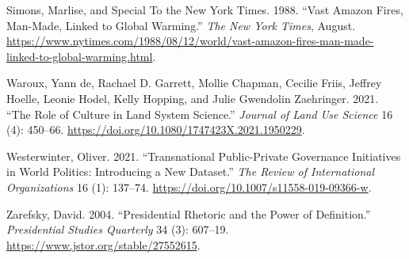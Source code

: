 \documentclass[
]{article}
\newlength{\cslhangindent}
\newlength{\cslentryspacingunit} %
\newenvironment{CSLReferences}[2] %
 {%
  \setlength{\parindent}{0pt}
  \ifodd #1
  \let\oldpar\par
  \def\par{\hangindent=\cslhangindent\oldpar}
  \fi
  \setlength{\parskip}{#2\cslentryspacingunit}
 }%
 {}
\begin{document}
\begin{CSLReferences}{1}{0}
\leavevmode{}%
Simons, Marlise, and Special To the New York Times. 1988. {``Vast Amazon
Fires, Man-Made, Linked to Global Warming.''} \emph{The New York Times},
August.
\url{https://www.nytimes.com/1988/08/12/world/vast-amazon-fires-man-made-linked-to-global-warming.html}.

\leavevmode{}%
Waroux, Yann de, Rachael D. Garrett, Mollie Chapman, Cecilie Friis,
Jeffrey Hoelle, Leonie Hodel, Kelly Hopping, and Julie Gwendolin
Zaehringer. 2021. {``The Role of Culture in Land System Science.''}
\emph{Journal of Land Use Science} 16 (4): 450--66.
\url{https://doi.org/10.1080/1747423X.2021.1950229}.

\leavevmode{}%
Westerwinter, Oliver. 2021. {``Transnational Public-Private Governance
Initiatives in World Politics: Introducing a New Dataset.''} \emph{The
Review of International Organizations} 16 (1): 137--74.
\url{https://doi.org/10.1007/s11558-019-09366-w}.

\leavevmode{}%
Zarefsky, David. 2004. {``Presidential Rhetoric and the Power of
Definition.''} \emph{Presidential Studies Quarterly} 34 (3): 607--19.
\url{https://www.jstor.org/stable/27552615}.

\end{CSLReferences}
\end{document}
